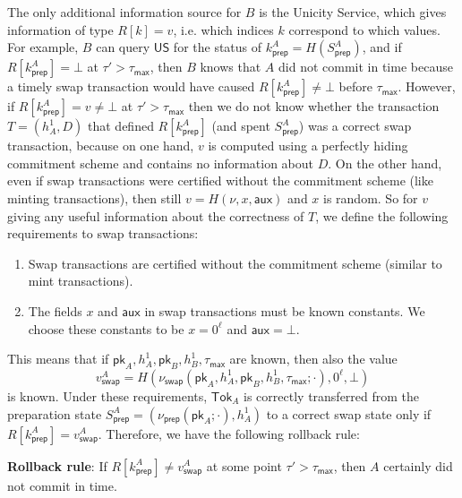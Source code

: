 \documentclass{article}
\newcommand{\pubkey}[0]{\mathsf{pk}}
\newcommand{\unisrv}[0]{\mathsf{US}}
\begin{document}
The only additional information source for $B$ is the Unicity Service, which gives information of type $R[k]=v$, i.e. which indices $k$ correspond to which values. For example, $B$ can query $\unisrv$ for the status of $k^A_\mathsf{prep}=H(S^A_\mathsf{prep})$, and
if $R[k^A_\mathsf{prep}]=\bot$ at $\tau'>\tau_\mathsf{max}$, then $B$ knows that $A$ did not commit in time because a timely swap transaction would have caused $R[k^A_\mathsf{prep}]\neq \bot$ before $\tau_\mathsf{max}$. However, if $R[k^A_\mathsf{prep}]=v\neq\bot$ at $\tau'>\tau_\mathsf{max}$ then we do not know whether the transaction $T=(h^1_A,D)$ that defined $R[k^A_\mathsf{prep}]$ (and spent $S^A_\mathsf{prep}$) was a correct swap transaction,
because on one hand, $v$ is computed using a perfectly hiding commitment scheme and contains no information about $D$.
On the other hand, even if swap transactions were certified without the commitment scheme (like minting transactions), then still $v=H(\nu,x,\mathsf{aux})$ and $x$ is random. So for $v$ giving any useful information about the correctness of $T$, we define the following requirements to swap transactions:
\begin{enumerate}
\item Swap transactions are certified without the commitment scheme (similar to mint transactions).
\item The fields $x$ and $\mathsf{aux}$ in swap transactions must be known constants. We choose these constants to be $x=0^\ell$ and $\mathsf{aux}=\bot$.
\end{enumerate}
This means that if $\pubkey_A,h^1_A,\pubkey_B,h^1_B,\tau_\mathsf{max}$ are known, then also the value
\[
v^A_\mathsf{swap}= H(\nu_\mathsf{swap}(\pubkey_A,h^1_A,\pubkey_B,h^1_B,\tau_\mathsf{max};\cdot),0^\ell,\bot)
\]
is known. Under these requirements,  $\mathsf{Tok}_A$ is correctly transferred from the preparation state
$S^A_\mathsf{prep}=(\nu_\mathsf{prep}(\pubkey_A;\cdot),h^1_A)$
to a correct swap state only if
$R[k^A_\mathsf{prep}]=v^A_\mathsf{swap}$.
Therefore, we have the following rollback rule:
\medskip\medskip

\noindent \textbf{Rollback rule}: If
$R[k^A_\mathsf{prep}]\neq v^A_\mathsf{swap}$ at some point $\tau'>\tau_\mathsf{max}$, then $A$ certainly did not commit in time.
\medskip
\end{document}
